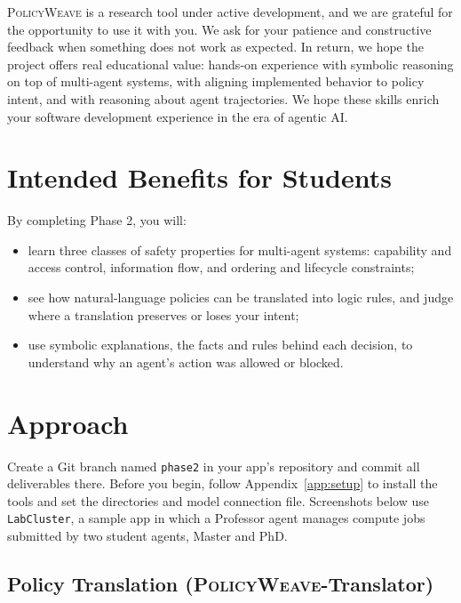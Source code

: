 \documentclass[10pt,letterpaper]{article}
\newcommand{\tool}{\textsc{PolicyWeave}}
\begin{document}
{\tool} is a research tool under active development, and we are grateful
for the opportunity to use it with you. We ask for your patience and
constructive feedback when something does not work as expected. In return, we
hope the project offers real educational value: hands-on experience with
symbolic reasoning on top of multi-agent systems, with aligning implemented
behavior to policy intent, and with reasoning about agent trajectories. We hope
these skills enrich your software development experience in the era of
agentic AI.

\section{Intended Benefits for Students}

By completing Phase 2, you will:
\begin{itemize}
\item learn three classes of safety properties for multi-agent systems:
capability and access control, information flow, and ordering and lifecycle
constraints;
\item see how natural-language policies can be translated into logic rules,
and judge where a translation preserves or loses your intent;
\item use symbolic explanations, the facts and rules behind each decision, to
understand why an agent's action was allowed or blocked.
\end{itemize}

\section{Approach}

Create a Git branch named \texttt{phase2} in your app's repository and commit
all deliverables there. Before you begin, follow Appendix~\ref{app:setup} to
install the tools and set the directories and model connection file.
Screenshots below use \texttt{LabCluster}, a sample app in which a Professor
agent manages compute jobs submitted by two student agents, Master and PhD.

\subsection{Policy Translation ({\tool}-Translator)}
\label{sec:translation}
\end{document}
